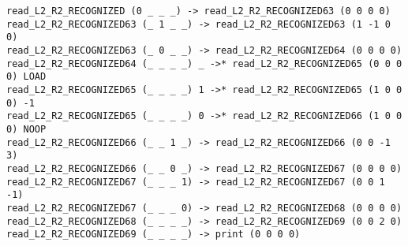 \documentclass[english,shortabstract,mgr]{iithesis}
\begin{document}
\begin{verbatim}
read_L2_R2_RECOGNIZED (0 _ _ _) -> read_L2_R2_RECOGNIZED63 (0 0 0 0)
read_L2_R2_RECOGNIZED63 (_ 1 _ _) -> read_L2_R2_RECOGNIZED63 (1 -1 0 0)
read_L2_R2_RECOGNIZED63 (_ 0 _ _) -> read_L2_R2_RECOGNIZED64 (0 0 0 0)
read_L2_R2_RECOGNIZED64 (_ _ _ _) _ ->* read_L2_R2_RECOGNIZED65 (0 0 0 0) LOAD
read_L2_R2_RECOGNIZED65 (_ _ _ _) 1 ->* read_L2_R2_RECOGNIZED65 (1 0 0 0) -1
read_L2_R2_RECOGNIZED65 (_ _ _ _) 0 ->* read_L2_R2_RECOGNIZED66 (1 0 0 0) NOOP
read_L2_R2_RECOGNIZED66 (_ _ 1 _) -> read_L2_R2_RECOGNIZED66 (0 0 -1 3)
read_L2_R2_RECOGNIZED66 (_ _ 0 _) -> read_L2_R2_RECOGNIZED67 (0 0 0 0)
read_L2_R2_RECOGNIZED67 (_ _ _ 1) -> read_L2_R2_RECOGNIZED67 (0 0 1 -1)
read_L2_R2_RECOGNIZED67 (_ _ _ 0) -> read_L2_R2_RECOGNIZED68 (0 0 0 0)
read_L2_R2_RECOGNIZED68 (_ _ _ _) -> read_L2_R2_RECOGNIZED69 (0 0 2 0)
read_L2_R2_RECOGNIZED69 (_ _ _ _) -> print (0 0 0 0)
\end{verbatim}
\end{document}
